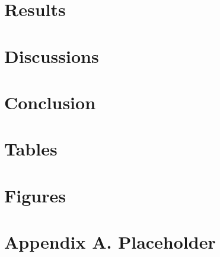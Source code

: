 \documentclass[12pt]{article}
\begin{document}
\section{Results} \label{sec:result}

\section{Discussions} \label{sec:discussion}

\section{Conclusion} \label{sec:conclusion}



\singlespacing
\setlength\bibsep{0pt}





\clearpage

\onehalfspacing

\section*{Tables} \label{sec:tab}



\clearpage

\section*{Figures} \label{sec:fig}




\clearpage

\section*{Appendix A. Placeholder} \label{sec:appendixa}
\end{document}
